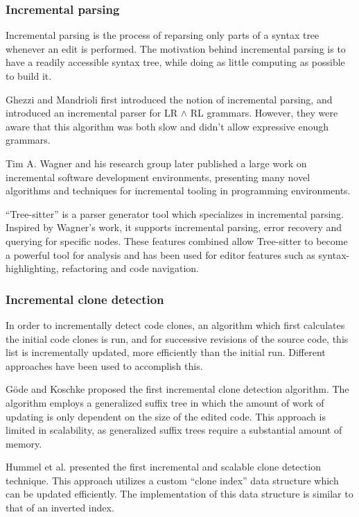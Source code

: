 \documentclass[12pt]{article}
\begin{document}
\subsubsection{Incremental parsing}

Incremental parsing is the process of reparsing only parts of a syntax tree whenever an
edit is performed. The motivation behind incremental parsing is to have a readily
accessible syntax tree, while doing as little computing as possible to build it.

Ghezzi and Mandrioli first introduced the notion of incremental parsing, and introduced an
incremental parser for LR $\land$ RL grammars. However, they were aware that this
algorithm was both slow and didn't allow expressive enough
grammars.\cite{incrementalparsing}

Tim A. Wagner\cite{PracticleAlgorithmsForIncremental} and his research group later
published a large work on incremental software development environments, presenting many
novel algorithms and techniques for incremental tooling in programming environments.

``Tree-sitter'' is a parser generator tool which specializes in incremental parsing.
Inspired by Wagner's work, it supports incremental parsing, error recovery and querying
for specific nodes.\cite{treesitter} These features combined allow Tree-sitter to become a
powerful tool for analysis and has been used for editor features such as
syntax-highlighting, refactoring and code navigation.

\subsubsection{Incremental clone detection}

In order to incrementally detect code clones, an algorithm which first calculates the
initial code clones is run, and for successive revisions of the source code, this list is
incrementally updated, more efficiently than the initial run. Different approaches have
been used to accomplish this.


Göde and Koschke\cite{GodeIncrementalCloneDetection} proposed the first incremental clone
detection algorithm. The algorithm employs a generalized suffix tree in which the amount
of work of updating is only dependent on the size of the edited code. This approach is
limited in scalability, as generalized suffix trees require a substantial amount of
memory.

Hummel et al.\cite{IndexBasedIncrementalCloneDetection} presented the first incremental
and scalable clone detection technique. This approach utilizes a custom ``clone index''
data structure which can be updated efficiently. The implementation of this data structure
is similar to that of an inverted index.
\end{document}
